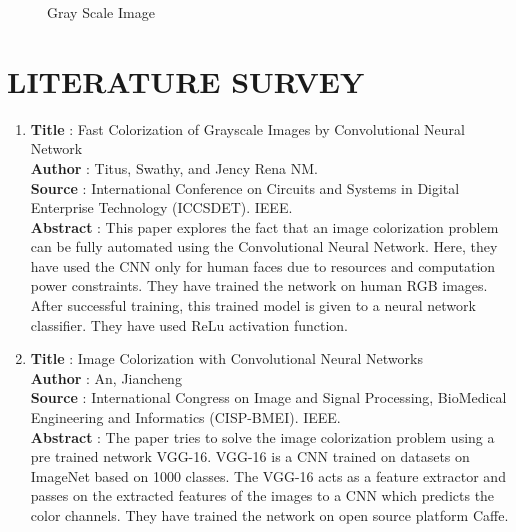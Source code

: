 \documentclass[12pt]{report}	%
\newcommand{\squeezeup}{\vspace{-0.6cm}}
\begin{document}
\begin{figure}[!h]
	\captionsetup{font=scriptsize}
	\begin{center}
		{}
		\caption{Gray Scale Image}
		\label{fig:1}
	\end{center}
	\squeezeup
\end{figure}
\newpage

\chapter{LITERATURE SURVEY}
\begin{enumerate}

	\item{\bf Title} : Fast Colorization of Grayscale Images by Convolutional Neural Network\\
	{\bf Author} : Titus, Swathy, and Jency Rena NM.\\
	{\bf Source} : International Conference on Circuits and Systems in Digital Enterprise Technology (ICCSDET). IEEE.\\
	{\bf Abstract} : This paper explores the fact that an image colorization problem can be fully automated using the Convolutional Neural Network. Here, they have used the CNN only for human faces due to resources and computation power constraints. They have trained the network on human RGB images. After successful training, this trained model is given to a neural network classifier. They have used ReLu activation function. \\

	\item{\bf Title} : Image Colorization with Convolutional Neural Networks\\
	{\bf Author} : An, Jiancheng\\
	{\bf Source} : International Congress on Image and Signal Processing, BioMedical Engineering and Informatics (CISP-BMEI). IEEE.\\
	{\bf Abstract} : The paper tries to solve the image colorization problem using a pre trained network VGG-16. VGG-16 is a CNN trained on datasets on ImageNet based on 1000 classes. The VGG-16 acts as a feature extractor and passes on the extracted features of the images to a CNN which predicts the color channels. They have trained the network on open source platform Caffe.\\
		

\end{enumerate}
\end{document}
